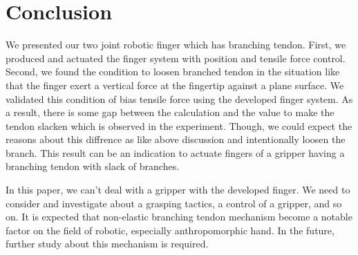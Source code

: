 \documentclass{llncs}
\begin{document}

\section{Conclusion} %
\label{sec:conclusion}
We presented our two joint robotic finger which has branching tendon.
First, we produced and actuated the finger system with position and tensile force control.
Second, we found the condition to loosen branched tendon in the situation like that the finger exert a vertical force at the fingertip against a plane surface.
We validated this condition of bias tensile force using the developed finger system.
As a result, there is some gap between the calculation and the value to make the tendon slacken which is observed in the experiment.
Though, we could expect the reasons about this diffrence as like above discussion and intentionally loosen the branch.
This result can be an indication to actuate fingers of a gripper having a branching tendon with slack of branches.

In this paper, we can't deal with a gripper with the developed finger.
We need to consider and investigate about a grasping tactics, a control of a gripper, and so on.
It is expected that non-elastic branching tendon mechanism become a notable factor on the field of robotic, especially anthropomorphic hand.
In the future, further study about this mechanism is required. 

\end{document}
